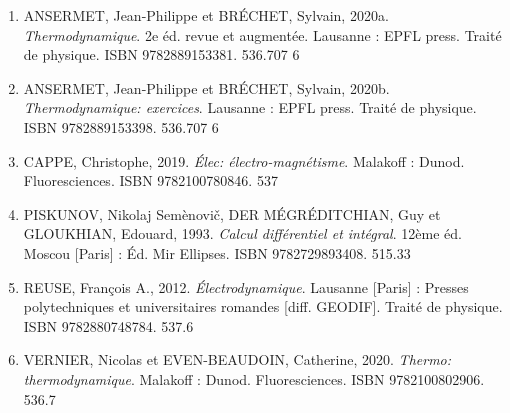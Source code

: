 \documentclass[11pt,fleqn]{book} %
\begin{document}
\begin{enumerate}[label=(\arabic*)]

\item ANSERMET, Jean-Philippe et BRÉCHET, Sylvain, 2020a. \textit{Thermodynamique}. 2e éd. revue et augmentée. Lausanne : EPFL press. Traité de physique. ISBN 9782889153381. 536.707 6

\item ANSERMET, Jean-Philippe et BRÉCHET, Sylvain, 2020b. \textit{Thermodynamique: exercices}. Lausanne : EPFL press. Traité de physique. ISBN 9782889153398. 536.707 6

\item CAPPE, Christophe, 2019. \textit{Élec: électro-magnétisme}. Malakoff : Dunod. Fluoresciences. ISBN 9782100780846. 537

\item PISKUNOV, Nikolaj Semènovič, DER MÉGRÉDITCHIAN, Guy et GLOUKHIAN, Edouard, 1993. \textit{Calcul différentiel et intégral}. 12ème éd. Moscou [Paris] : Éd. Mir Ellipses. ISBN 9782729893408. 515.33

\item REUSE, François A., 2012. \textit{Électrodynamique}. Lausanne [Paris] : Presses polytechniques et universitaires romandes [diff. GEODIF]. Traité de physique. ISBN 9782880748784. 537.6

\item VERNIER, Nicolas et EVEN-BEAUDOIN, Catherine, 2020. \textit{Thermo: thermodynamique}. Malakoff : Dunod. Fluoresciences. ISBN 9782100802906. 536.7

\end{enumerate}



\listoffigures




\cleardoublepage %
\setlength{\columnsep}{0.75cm} %
\printindex %

\end{document}
